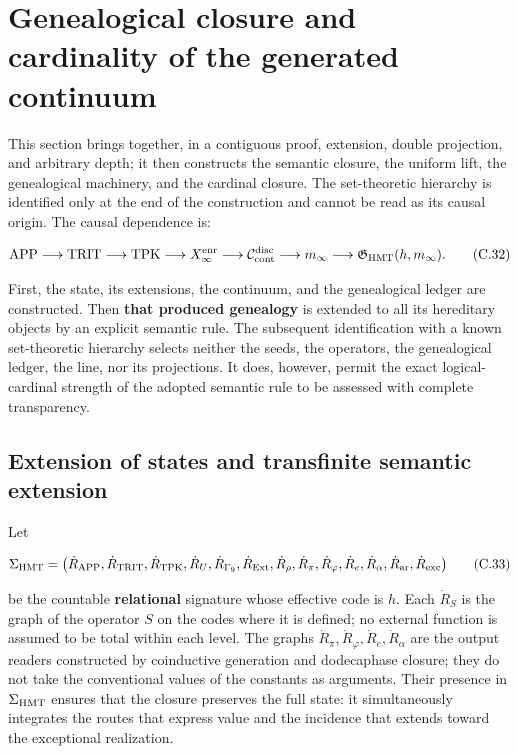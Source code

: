 \section{Genealogical closure and cardinality of the generated continuum}
\label{sec:cierre-cardinal-nativo}

This section brings together, in a contiguous proof, extension, double
projection, and arbitrary depth; it then constructs the semantic closure,
the uniform lift, the genealogical machinery, and the cardinal closure. The
set-theoretic hierarchy is identified only at the end of the construction and
cannot be read as its causal origin. The causal dependence is:

\[
 \mathrm{APP}\longrightarrow\mathrm{TRIT}\longrightarrow\mathrm{TPK}
 \longrightarrow X_\infty^{\rm enr}
 \longrightarrow\mathcal C_{\rm cont}^{\rm disc}
 \longrightarrow m_\infty
 \longrightarrow\mathfrak G_{\rm HMT}(h,m_\infty).
\tag{C.32}\label{eq:ch-cadena-causal}
\]

First, the state, its extensions, the continuum, and the genealogical ledger
are constructed. Then \textbf{that produced genealogy} is extended to all its
hereditary objects by an explicit semantic rule. The subsequent identification
with a known set-theoretic hierarchy selects neither the seeds, the operators,
the genealogical ledger, the line, nor its projections. It does, however,
permit the exact logical-cardinal strength of the adopted semantic rule to be
assessed with complete transparency.

\subsection{Extension of states and transfinite semantic extension}

Let

\[
 \Sigma_{\rm HMT}
 =\bigl(\dot R_{\rm APP},\dot R_{\rm TRIT},\dot R_{\rm TPK},
 \dot R_{U},\dot R_{\Gamma_9},\dot R_{\rm Ext},\dot R_\rho,
 \dot R_{\pi},\dot R_{\varphi},\dot R_e,\dot R_{\alpha},
 \dot R_{\rm ar},\dot R_{\rm exc}\bigr)
\tag{C.33}\label{eq:ch-signatura}
\]

be the countable \textbf{relational} signature whose effective code is \(h\).
Each \(\dot R_S\) is the graph of the operator \(S\) on the codes where it is
defined; no external function is assumed to be total within each level. The
graphs \(\dot R_{\pi},\dot R_{\varphi},\dot R_e,\dot R_{\alpha}\) are the
output readers constructed by coinductive generation and dodecaphase closure;
they do not take the conventional values of the constants as arguments. Their
presence in \(\Sigma_{\rm HMT}\) ensures that the closure preserves the full
state: it simultaneously integrates the routes that express value and the
incidence that extends toward the exceptional realization.

